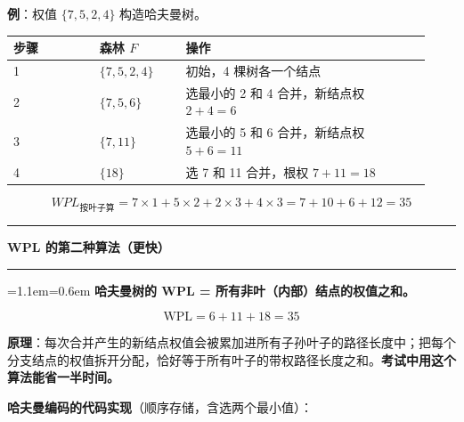 \documentclass[11pt,openany,UTF8]{ctexbook}
\newcommand{\callouthead}[2]{%
  \par\addvspace{7pt}\noindent
  {\color{#1}\rule[-0.15em]{3pt}{1.05em}}\hspace{0.5em}%
  {\bfseries\color{#1}#2}\par\nobreak\vspace{-0.35em}%
  {\color{rulesep}\hrule height 0.4pt}\nobreak\vspace{0.45em}%
  \begingroup\small\setlength{\parindent}{0pt}%
  \leftskip=1.1em\rightskip=0.6em\noindent\ignorespaces}
\newcommand{\calloutend}{\par\endgroup\addvspace{7pt}}
\newenvironment{callkey}[1]{\callouthead{keybar}{#1}}{\calloutend}
\begin{document}
\textbf{例}：权值 $\{7,5,2,4\}$ 构造哈夫曼树。

\begingroup\small\setlength{\tabcolsep}{4.0pt}
\begin{longtable}{@{}L{0.1902\linewidth}L{0.1902\linewidth}L{0.5480\linewidth}@{}}
\toprule
\textbf{步骤} & \textbf{森林 $F$} & \textbf{操作} \\
\midrule
{} & $\{7,5,2,4\}$ & 初始，4 棵树各一个结点 \\
2 & $\{7,5,6\}$ & 选最小的 2 和 4 合并，新结点权 $2+4=6$ \\
3 & $\{7,11\}$ & 选最小的 5 和 6 合并，新结点权 $5+6=11$ \\
4 & $\{18\}$ & 选 7 和 11 合并，根权 $7+11=18$ \\
\bottomrule
\end{longtable}
\endgroup

\[WPL_{\text{按叶子算}}=7\times1+5\times2+2\times3+4\times3=7+10+6+12=35\]

\begin{callkey}{WPL 的第二种算法（更快）}
\textbf{哈夫曼树的 WPL = 所有非叶（内部）结点的权值之和。}

\[\text{WPL}=6+11+18=35\]

\textbf{原理}：每次合并产生的新结点权值会被累加进所有子孙叶子的路径长度中；把每个分支结点的权值拆开分配，恰好等于所有叶子的带权路径长度之和。\textbf{考试中用这个算法能省一半时间。}

\end{callkey}

\textbf{哈夫曼编码的代码实现}（顺序存储，含选两个最小值）：
\end{document}
